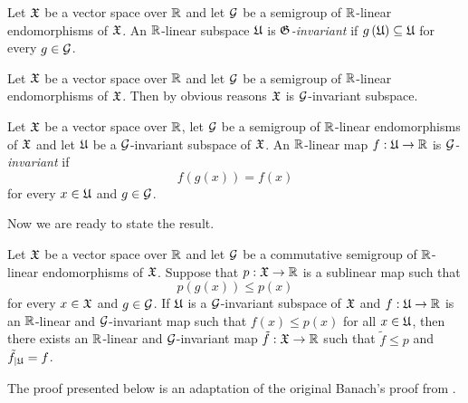 \begin{definition}
Let ${\mathfrak X}$ be a vector space over ${\mathbb R}$ and let ${\mathcal G}$ be a semigroup of ${\mathbb R}$-linear endomorphisms of ${\mathfrak X}$. An ${\mathbb R}$-linear subspace ${\mathfrak U}$ is \textit{${\mathfrak G}$-invariant} if $g\left({\mathfrak U}\right)\subseteq {\mathfrak U}$ for every $g\in {\mathcal G}$.
\end{definition}

\begin{example}\label{example:whole_space_is_invariant}
Let ${\mathfrak X}$ be a vector space over ${\mathbb R}$ and let ${\mathcal G}$ be a semigroup of ${\mathbb R}$-linear endomorphisms of ${\mathfrak X}$. Then by obvious reasons ${\mathfrak X}$ is ${\mathcal G}$-invariant subspace.
\end{example}

\begin{definition}
Let ${\mathfrak X}$ be a vector space over ${\mathbb R}$, let ${\mathcal G}$ be a semigroup of ${\mathbb R}$-linear endomorphisms of ${\mathfrak X}$ and let ${\mathfrak U}$ be a ${\mathcal G}$-invariant subspace of ${\mathfrak X}$. An ${\mathbb R}$-linear map $f:{\mathfrak U}\rightarrow {\mathbb R}$ is \textit{${\mathcal G}$-invariant} if
$$f\left(g(x)\right) = f(x)$$
for every $x\in {\mathfrak U}$ and $g\in {\mathcal G}$.
\end{definition}
\noindent
Now we are ready to state the result.

\begin{theorem}\label{theorem:invariant_Hahn_Banach}
Let ${\mathfrak X}$ be a vector space over ${\mathbb R}$ and let ${\mathcal G}$ be a commutative semigroup of ${\mathbb R}$-linear endomorphisms of ${\mathfrak X}$. Suppose that $p:{\mathfrak X}\rightarrow {\mathbb R}$ is a sublinear map such that
$$p\left(g(x)\right) \leq p(x)$$
for every $x \in {\mathfrak X}$ and $g \in {\mathcal G}$. If ${\mathfrak U}$ is a ${\mathcal G}$-invariant subspace of ${\mathfrak X}$ and $f:{\mathfrak U}\rightarrow {\mathbb R}$ is an ${\mathbb R}$-linear and ${\mathcal G}$-invariant map such that $f(x)\leq p(x)$ for all $x\in {\mathfrak U}$, then there exists an ${\mathbb R}$-linear and ${\mathcal G}$-invariant map $\tilde{f}:{\mathfrak X} \rightarrow {\mathbb R}$ such that $\tilde{f} \leq p$ and $\tilde{f}_{\mid {\mathfrak U}} = f$.
\end{theorem}
\noindent
The proof presented below is an adaptation of the original Banach's proof from \cite[Chapitre II, \S3]{banach1979theorieoperationslineaires}.

